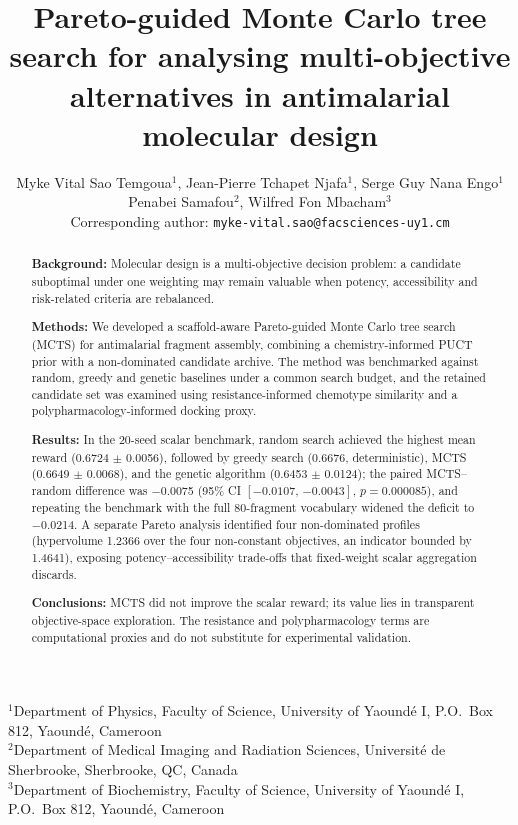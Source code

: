 \documentclass[10pt,a4paper]{article}
\title{\textbf{Pareto-guided Monte Carlo tree search for analysing multi-objective\\ alternatives in antimalarial molecular design}}
\author{%
  \begin{tabular}{c}
  Myke Vital Sao Temgoua$^{1}$, Jean-Pierre Tchapet Njafa$^{1}$, Serge Guy Nana Engo$^{1}$\\
  Penabei Samafou$^{2}$, Wilfred Fon Mbacham$^{3}$\\[0.2em]
  \small Corresponding author: \texttt{myke-vital.sao@facsciences-uy1.cm}
  \end{tabular}
}
\date{}
\begin{document}
\maketitle

\begin{center}
\begin{minipage}{0.92\textwidth}
\small\raggedright
$^{1}$Department of Physics, Faculty of Science, University of Yaound\'{e} I, P.O.\ Box 812, Yaound\'{e}, Cameroon\\
$^{2}$Department of Medical Imaging and Radiation Sciences, Universit\'{e} de Sherbrooke, Sherbrooke, QC, Canada\\
$^{3}$Department of Biochemistry, Faculty of Science, University of Yaound\'{e} I, P.O.\ Box 812, Yaound\'{e}, Cameroon
\end{minipage}
\end{center}

\begin{abstract}
\noindent
\textbf{Background:} Molecular design is a multi-objective decision problem: a candidate suboptimal under one weighting may remain valuable when potency, accessibility and risk-related criteria are rebalanced.\par
\textbf{Methods:} We developed a scaffold-aware Pareto-guided Monte Carlo tree search (MCTS) for antimalarial fragment assembly, combining a chemistry-informed PUCT prior with a non-dominated candidate archive. The method was benchmarked against random, greedy and genetic baselines under a common search budget, and the retained candidate set was examined using resistance-informed chemotype similarity and a polypharmacology-informed docking proxy.\par
\textbf{Results:} In the \num{20}-seed scalar benchmark, random search achieved the highest mean reward (\num{0.6724} $\pm$ \num{0.0056}), followed by greedy search (\num{0.6676}, deterministic), MCTS (\num{0.6649} $\pm$ \num{0.0068}), and the genetic algorithm (\num{0.6453} $\pm$ \num{0.0124}); the paired MCTS--random difference was \num{-0.0075} (95\% CI $[\num{-0.0107},\,\num{-0.0043}]$, $p = \num{0.000085}$), and repeating the benchmark with the full \num{80}-fragment vocabulary widened the deficit to \num{-0.0214}. A separate Pareto analysis identified four non-dominated profiles (hypervolume \num{1.2366} over the four non-constant objectives, an indicator bounded by \num{1.4641}), exposing potency--accessibility trade-offs that fixed-weight scalar aggregation discards.\par
\textbf{Conclusions:} MCTS did not improve the scalar reward; its value lies in transparent objective-space exploration. The resistance and polypharmacology terms are computational proxies and do not substitute for experimental validation.
\end{abstract}
\end{document}

